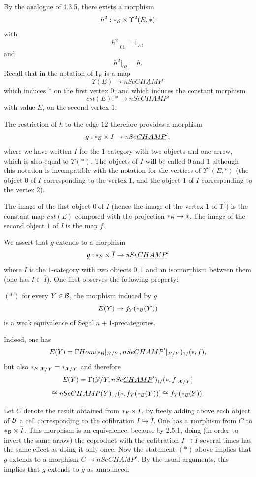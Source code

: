 By the analogue of \cite{limits} 4.3.5, there exists a morphism
$$
h^2: \ast _{{\cal B}} \times \Upsilon ^2(E,\ast )
$$
with
$$
h^2|_{01} = 1_E,
$$
and
$$
h^2|_{02} = h.
$$
Recall that in the notation of \cite{limits}
$1_E$ is a map
$$
\Upsilon (E) \rightarrow nSe\underline{CHAMP}'
$$
which induces $\ast$ on the first vertex $0$; and
which induces the constant morphism
$$
cst(E) :\ast \rightarrow nSe\underline{CHAMP}'
$$
with value $E$, on the second vertex $1$.

The restriction of $h$ to the edge $12$ therefore provides a morphism
$$
g: \ast _{{\cal B}} \times I \rightarrow nSe\underline{CHAMP}',
$$
where we have written $I$ for the $1$-category with two objects and one arrow,
which is also equal to $\Upsilon (\ast )$.
The objects of $I$ will be called $0$ and $1$ although this notation is
incompatible with the notation for the vertices of $\Upsilon ^2(E,\ast )$
(the object $0$ of $I$ corresponding to the vertex $1$,
and the object $1$ of $I$ corresponding to the
vertex $2$).

The image of the first object $0$ of $I$ (hence the image of the vertex $1$ of
$\Upsilon ^2$)
is the constant map $cst(E)$ composed with the projection $\ast
_{{\cal B}}\rightarrow \ast$. The image
of the second object $1$ of $I$ is the map $f$.

We assert that $g$ extends to a morphism
$$
\overline{g}: \ast _{{\cal B}} \times \overline{I} \rightarrow
nSe\underline{CHAMP}'
$$
where $\overline{I}$ is the $1$-category with two objects $0,1$ and an
isomorphism between them (one has $I\subset \overline{I}$). One
first observes the following property:

$(\ast
)$ for every
$Y\in {\cal B}$, the morphism induced by $g$
$$
E(Y)\rightarrow f_Y(\ast _{{\cal B}}(Y))
$$
is a weak equivalence of Segal $n+1$-precategories.

Indeed, one has
$$
E(Y)= \Gamma \underline{Hom}(\ast _{{\cal B} }|_{{\cal X} /Y},
nSe\underline{CHAMP}'|_{{\cal X} /Y})_{1/}(\ast , f),
$$
but also $\ast _{{\cal B} }|_{{\cal X} /Y}=\ast _{{\cal X} /Y}$ and therefore
$$
E(Y)= \Gamma ({\cal Y} /Y, nSe\underline{CHAMP}')_{1/}(\ast , f|_{{\cal X} /Y})
$$
$$
\cong nSeCHAMP (Y)_{1/}(\ast , f_Y(\ast _{{\cal B}}(Y))) \cong
f_Y(\ast _{{\cal B}}(Y)).
$$

Let $C$ denote the result obtained
from $\ast _{{\cal B}} \times I$, by freely adding
above each object of ${\cal B}$ a cell corresponding to the cofibration
$I\hookrightarrow \overline{I}$. One has a morphism from $C$ to
$\ast_{{\cal B}} \times \overline{I}$. This morphism is an equivalence, because by
\cite{limits} 2.5.1, doing (in order to invert the same arrow)
the coproduct with the cofibration $I\rightarrow
\overline{I}$ several times has the same effect as doing it only once.
Now the statement $(\ast )$ above implies that $g$ extends to a
morphism $C\rightarrow nSe\underline{CHAMP}'$. By the usual arguments,
this implies that $g$ extends to $\overline{g}$ as announced.

